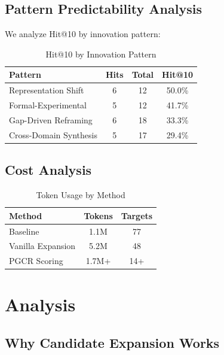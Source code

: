 \documentclass[conference]{IEEEtran}
\begin{document}
\subsection{Pattern Predictability Analysis}

We analyze Hit@10 by innovation pattern:

\begin{table}[htbp]
\caption{Hit@10 by Innovation Pattern}
\label{tab:patterns}
\begin{center}
\begin{tabular}{lccc}
\toprule
Pattern & Hits & Total & Hit@10 \\
\midrule
Representation Shift & 6 & 12 & 50.0\% \\
Formal-Experimental & 5 & 12 & 41.7\% \\
Gap-Driven Reframing & 6 & 18 & 33.3\% \\
Cross-Domain Synthesis & 5 & 17 & 29.4\% \\
\bottomrule
\end{tabular}
\end{center}
\end{table}

\subsection{Cost Analysis}

\begin{table}[htbp]
\caption{Token Usage by Method}
\label{tab:cost}
\begin{center}
\begin{tabular}{lcc}
\toprule
Method & Tokens & Targets \\
\midrule
Baseline & 1.1M & 77 \\
Vanilla Expansion & 5.2M & 48 \\
PGCR Scoring & 1.7M+ & 14+ \\
\bottomrule
\end{tabular}
\end{center}
\end{table}

\section{Analysis}

\subsection{Why Candidate Expansion Works}
\end{document}
